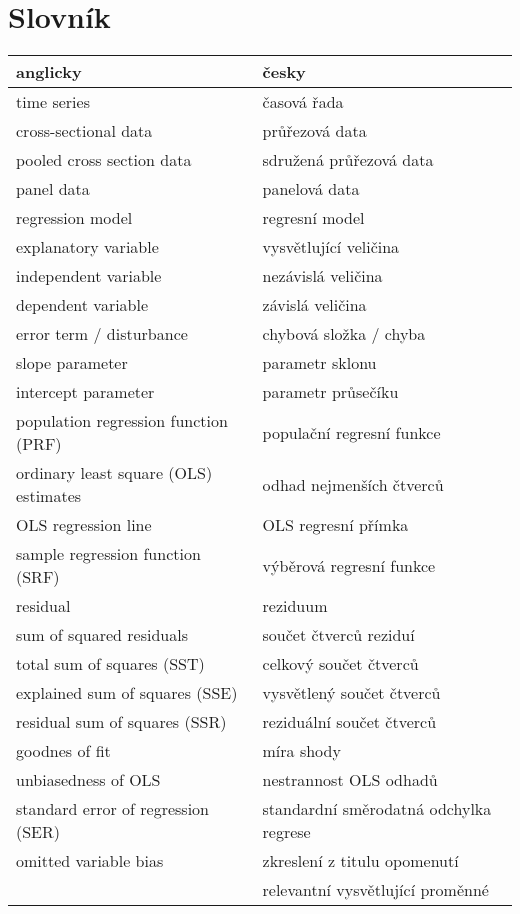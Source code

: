 \chapter{Slovník}

\begin{table}
\begin{center}
\begin{tabular}{l l} 
\bf{anglicky} & \bf{česky}\\
\hline
time series & časová řada\\
cross-sectional data & průřezová data\\
pooled cross section data & sdružená průřezová data\\
panel data & panelová data\\
regression model & regresní model\\
explanatory variable & vysvětlující veličina\\
independent variable & nezávislá veličina\\
dependent variable & závislá veličina\\
error term / disturbance & chybová složka / chyba\\
slope parameter & parametr sklonu\\
intercept parameter & parametr průsečíku\\
population regression function (PRF) & populační regresní funkce\\
ordinary least square (OLS) estimates & odhad nejmenších čtverců\\
OLS regression line & OLS regresní přímka\\
sample regression function (SRF) & výběrová regresní funkce\\
residual & reziduum\\
sum of squared residuals & součet čtverců reziduí\\
total sum of squares (SST) & celkový součet čtverců\\
explained sum of squares (SSE) & vysvětlený součet čtverců\\
residual sum of squares (SSR) & reziduální součet čtverců\\
goodnes of fit & míra shody\\
unbiasedness of OLS & nestrannost OLS odhadů\\
standard error of regression (SER) & standardní směrodatná odchylka regrese\\
omitted variable bias & zkreslení z titulu opomenutí\\
 & relevantní vysvětlující proměnné\\

\end{tabular}
\end{center}
\end{table}
